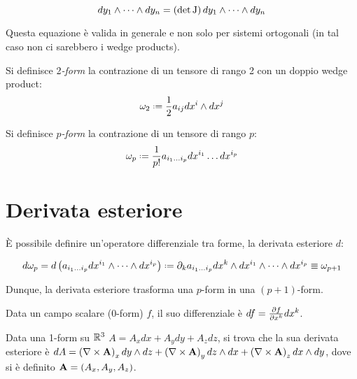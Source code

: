 \begin{equation}
	dy_1 \wedge \dots \wedge dy_n = \left( \det\mathbf{\text{J}} \right) dy_1 \wedge \dots \wedge dy_n
	\label{eq:3.5}
\end{equation}

Questa equazione è valida in generale e non solo per sistemi ortogonali (in tal caso non ci sarebbero i wedge products).

\begin{definition}
	Si definisce 2\textit{-form} la contrazione di un tensore di rango 2 con un doppio wedge product:
	\begin{equation}
		\omega_2 \defeq \frac{1}{2} a_{ij} dx^i \wedge dx^j
		\label{eq:3.6}
	\end{equation}
\end{definition}

\begin{definition}\label{p-form}
	Si definisce $ p $\textit{-form} la contrazione di un tensore di rango $ p $:
	\begin{equation}
		\omega_p \defeq \frac{1}{p!} a_{i_1 \dots i_p} dx^{i_1} \dots dx^{i_p}
		\label{eq:3.7}
	\end{equation}
\end{definition}

\section{Derivata esteriore}

È possibile definire un'operatore differenziale tra forme, la derivata esteriore $ d $:

\begin{equation}
	d\omega_p = d\left( a_{i_1 \dots i_p} dx^{i_1} \wedge \dots \wedge dx^{i_p} \right) \defeq \pa_k a_{i_1 \dots i_p} dx^k \wedge dx^{i_1} \wedge \dots \wedge dx^{i_p} \equiv \omega_{p+1}
	\label{eq:3.8}
\end{equation}

Dunque, la derivata esteriore trasforma una $ p $-form in una $ (p+1) $-form.

\begin{example}
	Data un campo scalare (0-form) $ f $, il suo differenziale è $ df = \frac{\partial f}{\partial x^k} dx^k $.
\end{example}

\begin{example}
	Data una 1-form su $ \mathbb{R}^3 $ $ A = A_x dx + A_y dy + A_z dz $, si trova che la sua derivata esteriore è $ dA = \left( \nabla\times\mathbf{A} \right)_x dy \wedge dz + \left( \nabla\times\mathbf{A} \right)_y dz \wedge dx + \left( \nabla\times\mathbf{A} \right)_z dx \wedge dy $, dove si è definito $ \mathbf{A} = \left( A_x, A_y, A_z \right) $.
\end{example}

